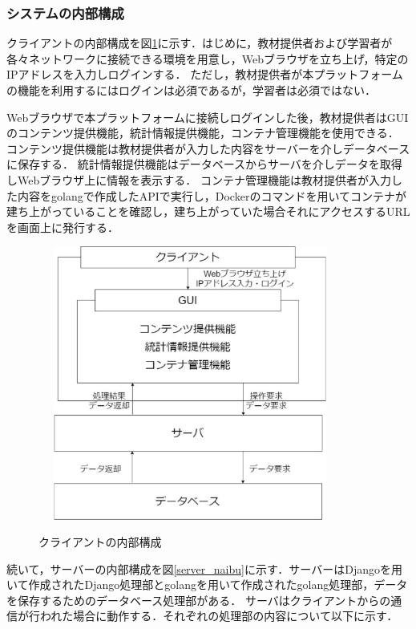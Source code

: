 \newpage
\subsubsection{システムの内部構成}
クライアントの内部構成を図\ref{client_naibu}に示す．はじめに，教材提供者および学習者が各々ネットワークに接続できる環境を用意し，Webブラウザを立ち上げ，特定のIPアドレスを入力しログインする．
ただし，教材提供者が本プラットフォームの機能を利用するにはログインは必須であるが，学習者は必須ではない．

Webブラウザで本プラットフォームに接続しログインした後，教材提供者はGUIのコンテンツ提供機能，統計情報提供機能，コンテナ管理機能を使用できる．
コンテンツ提供機能は教材提供者が入力した内容をサーバーを介しデータベースに保存する．
統計情報提供機能はデータベースからサーバを介しデータを取得しWebブラウザ上に情報を表示する．
コンテナ管理機能は教材提供者が入力した内容をgolangで作成したAPIで実行し，Dockerのコマンドを用いてコンテナが建ち上がっていることを確認し，建ち上がっていた場合それにアクセスするURLを画面上に発行する．

\begin{figure}[htbp]
    \begin{center}
        \includegraphics[width=10cm,height=9cm,keepaspectratio]{client_arch-crop.pdf}\\
    \end{center}
    \caption{クライアントの内部構成}
    \label{client_naibu}
\end{figure}

\newpage
続いて，サーバーの内部構成を図\ref{server_naibu}に示す．サーバーはDjangoを用いて作成されたDjango処理部とgolangを用いて作成されたgolang処理部，データを保存するためのデータベース処理部がある．
サーバはクライアントからの通信が行われた場合に動作する．それぞれの処理部の内容について以下に示す．

